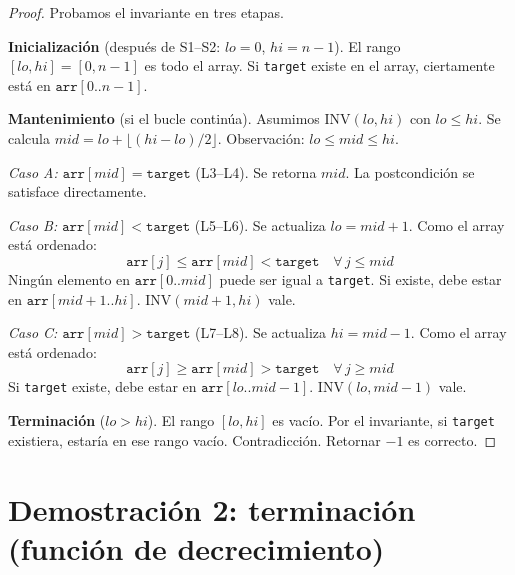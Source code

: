 \documentclass[11pt, letterpaper]{article}
\theoremstyle{definition}
\theoremstyle{plain}
\theoremstyle{remark}
\begin{document}
\begin{proof}
Probamos el invariante en tres etapas.

\textbf{Inicialización} (después de S1--S2: $\mathit{lo} = 0$,
$\mathit{hi} = n - 1$). El rango $[\mathit{lo}, \mathit{hi}] = [0, n{-}1]$
es todo el array. Si \texttt{target} existe en el array, ciertamente
está en $\texttt{arr}[0..n{-}1]$. \checkmark

\textbf{Mantenimiento} (si el bucle continúa). Asumimos
$\text{INV}(\mathit{lo}, \mathit{hi})$ con $\mathit{lo} \leq \mathit{hi}$.
Se calcula $\mathit{mid} = \mathit{lo} +
\lfloor(\mathit{hi} - \mathit{lo})/2\rfloor$. Observación:
$\mathit{lo} \leq \mathit{mid} \leq \mathit{hi}$.

\emph{Caso A: $\texttt{arr}[\mathit{mid}] = \texttt{target}$} (L3--L4).
Se retorna $\mathit{mid}$. La postcondición se satisface directamente.
\checkmark

\emph{Caso B: $\texttt{arr}[\mathit{mid}] < \texttt{target}$} (L5--L6).
Se actualiza $\mathit{lo} = \mathit{mid} + 1$. Como el array está
ordenado:
\[
  \texttt{arr}[j] \leq \texttt{arr}[\mathit{mid}] < \texttt{target}
  \quad \forall\, j \leq \mathit{mid}
\]
Ningún elemento en $\texttt{arr}[0..\mathit{mid}]$ puede ser igual a
\texttt{target}. Si existe, debe estar en
$\texttt{arr}[\mathit{mid}{+}1..\mathit{hi}]$.
$\text{INV}(\mathit{mid}{+}1, \mathit{hi})$ vale. \checkmark

\emph{Caso C: $\texttt{arr}[\mathit{mid}] > \texttt{target}$} (L7--L8).
Se actualiza $\mathit{hi} = \mathit{mid} - 1$. Como el array está
ordenado:
\[
  \texttt{arr}[j] \geq \texttt{arr}[\mathit{mid}] > \texttt{target}
  \quad \forall\, j \geq \mathit{mid}
\]
Si \texttt{target} existe, debe estar en
$\texttt{arr}[\mathit{lo}..\mathit{mid}{-}1]$.
$\text{INV}(\mathit{lo}, \mathit{mid}{-}1)$ vale. \checkmark

\textbf{Terminación} ($\mathit{lo} > \mathit{hi}$). El rango
$[\mathit{lo}, \mathit{hi}]$ es vacío. Por el invariante, si
\texttt{target} existiera, estaría en ese rango vacío. Contradicción.
Retornar $-1$ es correcto. \checkmark
\end{proof}

\section{Demostración 2: terminación (función de decrecimiento)}
\end{document}
